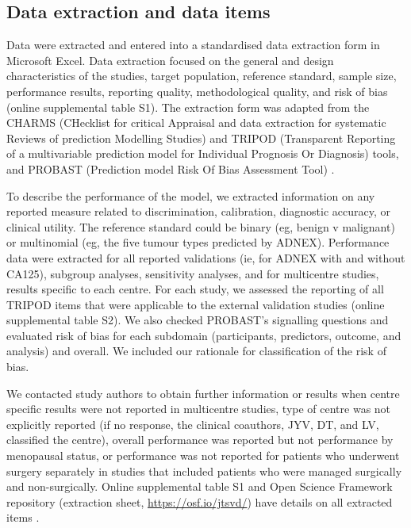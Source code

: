 \subsection{Data extraction and data items}
Data were extracted and entered into a standardised data extraction form in Microsoft Excel. Data extraction focused on the general and design characteristics of the studies, target population, reference standard, sample size, performance results, reporting quality, methodological quality, and risk of bias (online supplemental table S1). The extraction form was adapted from the CHARMS (CHecklist for critical Appraisal and data extraction for systematic Reviews of prediction Modelling Studies) and TRIPOD (Transparent Reporting of a multivariable prediction model for Individual Prognosis Or Diagnosis) tools, and PROBAST (Prediction model Risk Of Bias Assessment Tool) \cite{wolffPROBASTToolAssess2019,
moonsCriticalAppraisalData2014,
collinsTransparentReportingMultivariable2015}.

To describe the performance of the model, we extracted information on any reported measure related to discrimination, calibration, diagnostic accuracy, or clinical utility. The reference standard could be binary (eg, benign v malignant) or multinomial (eg, the five tumour types predicted by ADNEX). Performance data were extracted for all reported validations (ie, for ADNEX with and without CA125), subgroup analyses, sensitivity analyses, and for multicentre studies, results specific to each centre. For each study, we assessed the reporting of all TRIPOD items that were applicable to the external validation studies (online supplemental table S2). We also checked PROBAST’s signalling questions and evaluated risk of bias for each subdomain (participants, predictors, outcome, and analysis) and overall. We included our rationale for classification of the risk of bias.

We contacted study authors to obtain further information or results when centre specific results were not reported in multicentre studies, type of centre was not explicitly reported (if no response, the clinical coauthors, JYV, DT, and LV, classified the centre), overall performance was reported but not performance by menopausal status, or performance was not reported for patients who underwent surgery separately in studies that included patients who were managed surgically and non-surgically. Online supplemental table S1 and Open Science Framework repository (extraction sheet, \url{https://osf.io/jtsvd/}) have details on all extracted items \cite{barrenadaADNEXRiskModel2025}.

